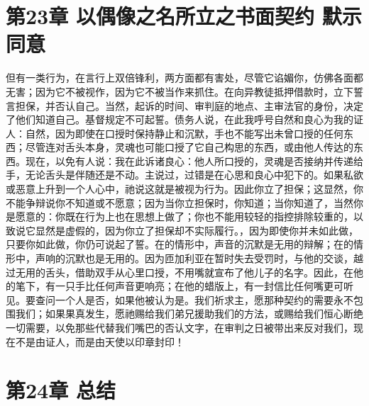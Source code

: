 
\section{第23章 以偶像之名所立之书面契约 默示同意}

但有一类行为，在言行上双倍锋利，两方面都有害处，尽管它谄媚你，仿佛各面都无害；因为它不被视作，因为它不被当作来抓住。在向异教徒抵押借款时，立下誓言担保，并否认自己。当然，起诉的时间、审判庭的地点、主审法官的身份，决定了他们知道自己。基督规定不可起誓。债务人说，在此我呼号自然和良心为我的证人：自然，因为即使在口授时保持静止和沉默，手也不能写出未曾口授的任何东西；尽管连对舌头本身，灵魂也可能口授了它自己构思的东西，或由他人传达的东西。现在，以免有人说：我在此诉诸良心：他人所口授的，灵魂是否接纳并传递给手，无论舌头是伴随还是不动。主说过，过错是在心思和良心中犯下的。如果私欲或恶意上升到一个人心中，祂说这就是被视为行为。因此你立了担保；这显然，你不能争辩说你不知道或不愿意；因为当你立担保时，你知道；当你知道了，当然你是愿意的：你既在行为上也在思想上做了；你也不能用较轻的指控排除较重的，以致说它显然是虚假的，因为你立了担保却不实际履行。，因为即使你并未如此做，只要你如此做，你仍可说起了誓。在的情形中，声音的沉默是无用的辩解；在的情形中，声响的沉默也是无用的。因为匝加利亚在暂时失去受罚时，与他的交谈，越过无用的舌头，借助双手从心里口授，不用嘴就宣布了他儿子的名字。因此，在他的笔下，有一只手比任何声音更响亮；在他的蜡版上，有一封信比任何嘴更可听见。要查问一个人是否，如果他被认为是。我们祈求主，愿那种契约的需要永不包围我们；如果果真发生，愿祂赐给我们弟兄援助我们的方法，或赐给我们恒心断绝一切需要，以免那些代替我们嘴巴的否认文字，在审判之日被带出来反对我们，现在不是由证人，而是由天使以印章封印！\par


\section{第24章 总结}

